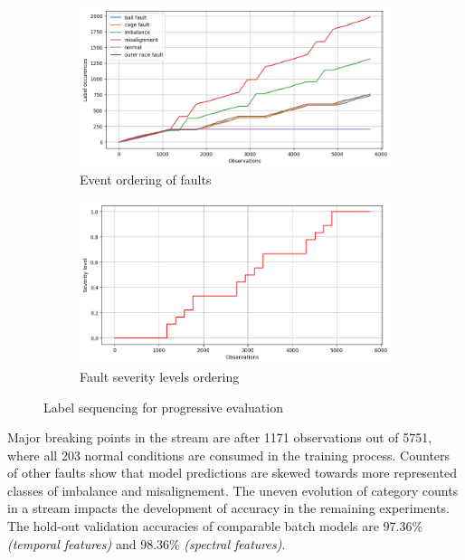 \begin{figure}[ht]
    \centering
    \begin{subfigure}[b]{0.49\textwidth}
        \includegraphics[width=\textwidth]{assets/design/Online-event-ordering-fault-train.png}
        \caption{Event ordering of faults}
        \label{fig:design:online-event-order}
    \end{subfigure}
    \hfill
    \begin{subfigure}[b]{0.49\textwidth}
        \includegraphics[width=\textwidth]{assets/design/Online-severity-levels.png}
        \caption{Fault severity levels ordering}
        \label{fig:design:online-count-severity-level}
    \end{subfigure}
    \caption{Label sequencing for progressive evaluation}
\end{figure}

Major breaking points in the stream are after 1171 observations out of 5751, where all 203 normal conditions are consumed in the training process. Counters of other faults show that model predictions are skewed towards more represented classes of imbalance and misalignement. The uneven evolution of category counts in a stream impacts the development of accuracy in the remaining experiments. The hold-out validation accuracies of comparable batch models are 97.36\% \emph{(temporal features)} and 98.36\% \emph{(spectral features)}.
	
